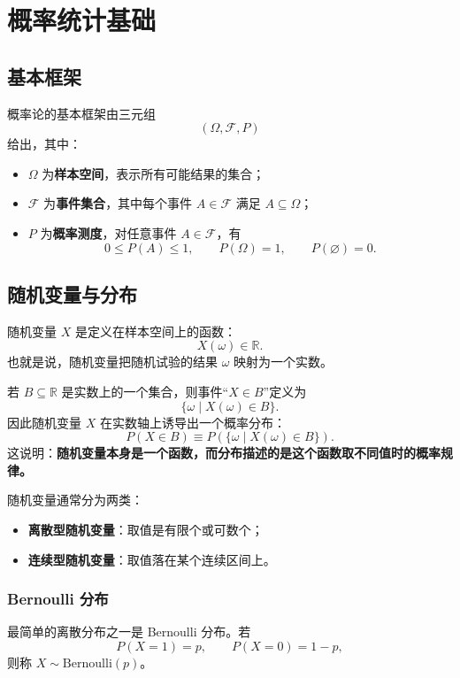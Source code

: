 \newpage
\chapter{概率统计基础}

\section{基本框架}
概率论的基本框架由三元组
\[
(\Omega,\mathcal{F},P)
\]
给出，其中：
\begin{itemize}
    \item \(\Omega\) 为\textbf{样本空间}，表示所有可能结果的集合；
    \item \(\mathcal{F}\) 为\textbf{事件集合}，其中每个事件 \(A\in\mathcal{F}\) 满足 \(A\subseteq \Omega\)；
    \item \(P\) 为\textbf{概率测度}，对任意事件 \(A\in\mathcal{F}\)，有
    \[
    0\le P(A)\le 1,\qquad P(\Omega)=1,\qquad P(\varnothing)=0.
    \]
\end{itemize}

\section{随机变量与分布}

随机变量 \(X\) 是定义在样本空间上的函数：
\[
X(\omega)\in \mathbb{R}.
\]
也就是说，随机变量把随机试验的结果 \(\omega\) 映射为一个实数。

若 \(B\subseteq \mathbb{R}\) 是实数上的一个集合，则事件``\(X\in B\)''定义为
\[
\{\omega\mid X(\omega)\in B\}.
\]
因此随机变量 \(X\) 在实数轴上诱导出一个概率分布：
\[
P(X\in B)\equiv P\left(\{\omega\mid X(\omega)\in B\}\right).
\]
这说明：\textbf{随机变量本身是一个函数，而分布描述的是这个函数取不同值时的概率规律。}

随机变量通常分为两类：

\begin{itemize}
    \item \textbf{离散型随机变量}：取值是有限个或可数个；
    \item \textbf{连续型随机变量}：取值落在某个连续区间上。
\end{itemize}

\subsection{Bernoulli 分布}

最简单的离散分布之一是 Bernoulli 分布。若
\[
P(X=1)=p,\qquad P(X=0)=1-p,
\]
则称 \(X\sim \mathrm{Bernoulli}(p)\)。

